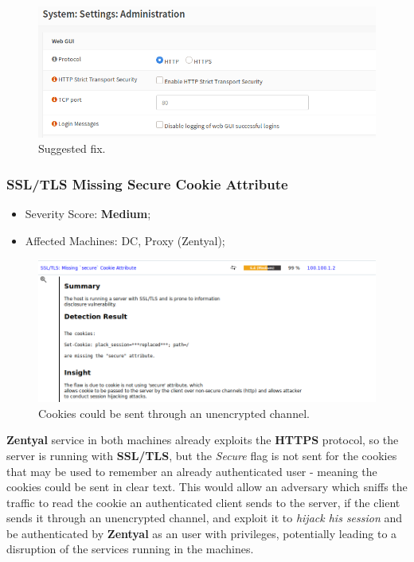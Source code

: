 \begin{figure}[!htb]
\centering
\begin{minipage}{.5\textwidth}
  \centering
  \includegraphics[width=1\textwidth]{vulnerabilityToMitigate.png}
  \caption[a]{Suggested fix.}\label{fig:11}
\end{minipage}%
\end{figure}

\subsubsection{SSL/TLS Missing Secure Cookie Attribute}
\begin{itemize}
\item Severity Score: \textbf{Medium};
\item Affected Machines: DC, Proxy (Zentyal);
\end{itemize}
\begin{figure}[!htb]
\centering
\begin{minipage}{.5\textwidth}
  \centering
  \includegraphics[width=1\textwidth]{secureCookiesDCVuln.png}
  \caption[a]{Cookies could be sent through an unencrypted channel.}\label{fig:12}
\end{minipage}%
\end{figure}

\textbf{Zentyal} service in both machines already exploits the \textbf{HTTPS} protocol, so the server is running with \textbf{SSL/TLS}, but the \textit{Secure} flag is not sent for the cookies that may be used to remember an already authenticated user - meaning the cookies could be sent in clear text. This would allow an adversary which sniffs the traffic to read the cookie an authenticated client sends to the server, if the client sends it through an unencrypted channel, and exploit it to \textit{hijack his session} and be authenticated by \textbf{Zentyal} as an user with privileges, potentially leading to a disruption of the services running in the machines.

